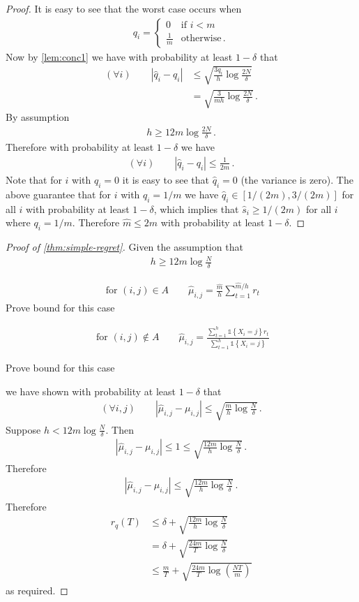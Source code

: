 \documentclass{article}
\newcommand{\set}[1]{\left\{#1\right\}}
\newcommand{\ind}[1]{\mathds{1}\!\!\set{#1}}
\newcommand{\eq}[1]{\begin{align*}#1\end{align*}}
\theoremstyle{plain}
\theoremstyle{definition}
\begin{document}
\begin{proof}
It is easy to see that the worst case occurs when 
\eq{
q_i = \begin{cases}
0 & \text{if } i < m \\
\frac{1}{m} & \text{otherwise}\,.
\end{cases}
}
Now by \cref{lem:conc1} we have with probability at least $1 - \delta$ that 
\eq{
(\forall i) \qquad \left| \hat q_i - q_i\right| 
&\leq \sqrt{\frac{3q_i}{h} \log \frac{2N}{\delta}} \\
&= \sqrt{\frac{3}{mh} \log\frac{2N}{\delta}}\,. 
}
By assumption 
\eq{
h \geq 12m \log \frac{2N}{\delta}\,.
}
Therefore with probability at least $1 - \delta$ we have
\eq{
(\forall i) \qquad \left|\hat q_i - q_i\right| \leq \frac{1}{2m}\,.
}
Note that for $i$ with $q_i = 0$ it is easy to see that $\hat q_i = 0$ (the variance is zero). The above guarantee that
for $i$ with $q_i = 1/m$ we have $\hat q_i \in [1/(2m), 3/(2m)]$ for all $i$ with probability at least $1 - \delta$,
which implies that $\hat s_i \geq 1/(2m)$ for all $i$ where $q_i = 1/m$.
Therefore $\hat m \leq 2m$ with probability at least $1 - \delta$. 
\end{proof}


\begin{proof}[Proof of \cref{thm:simple-regret}]
Given the assumption that
\eq{
h \geq 12m \log \frac{N}{\delta}
}

\eq {
\text{ for } (i,j)\in A \qquad \hat \mu_{i,j} = \frac{\hat m}{h} \sum_{t=1}^{\hat m/h} r_t
}
Prove bound for this case

\eq {
\text{ for } (i,j)\notin A \qquad \hat \mu_{i,j} = \frac{\sum_{t=1}^h \ind{X_i = j} r_t}{\sum_{t=1}^h \ind{X_i = j}}
}

Prove bound for this case


we have shown with probability at least $1 - \delta$ that
\eq{
(\forall i, j) \qquad \left|\hat \mu_{i,j} - \mu_{i,j}\right| \leq \sqrt{\frac{m}{h} \log\frac{N}{\delta}}\,.
}
Suppose $h < 12m \log \frac{N}{\delta}$. Then
\eq{
\left|\hat \mu_{i,j} - \mu_{i,j}\right| \leq 1 \leq \sqrt{\frac{12m}{h} \log \frac{N}{\delta}}\,.
}
Therefore
\eq{
\left|\hat \mu_{i,j} - \mu_{i,j}\right| \leq \sqrt{\frac{12m}{h} \log \frac{N}{\delta}}\,.
}
Therefore 
\eq{
r_q(T) 
&\leq \delta + \sqrt{\frac{12m}{h} \log \frac{N}{\delta}} \\
&= \delta + \sqrt{\frac{24m}{T} \log \frac{N}{\delta}} \\
&\leq \frac{m}{T} + \sqrt{\frac{24m}{T} \log \left(\frac{NT}{m}\right)}
}
as required.
\end{proof}
\end{document}
